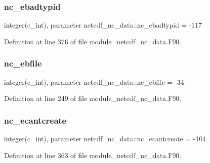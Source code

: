 \mbox{\label{namespacenetcdf__nc__data_aacaa397d41962ebba916f042f0f53759}} 
\subsubsection{\texorpdfstring{nc\+\_\+ebadtypid}{nc\_ebadtypid}}
{\footnotesize\ttfamily integer(c\+\_\+int), parameter netcdf\+\_\+nc\+\_\+data\+::nc\+\_\+ebadtypid = -\/117}



Definition at line 376 of file module\+\_\+netcdf\+\_\+nc\+\_\+data.\+F90.

\mbox{\label{namespacenetcdf__nc__data_a960115687ca85c5f961d7131ced33af5}} 
\subsubsection{\texorpdfstring{nc\+\_\+ebfile}{nc\_ebfile}}
{\footnotesize\ttfamily integer(c\+\_\+int), parameter netcdf\+\_\+nc\+\_\+data\+::nc\+\_\+ebfile = -\/34}



Definition at line 249 of file module\+\_\+netcdf\+\_\+nc\+\_\+data.\+F90.

\mbox{\label{namespacenetcdf__nc__data_a4b769146020153d93441a502218706e0}} 
\subsubsection{\texorpdfstring{nc\+\_\+ecantcreate}{nc\_ecantcreate}}
{\footnotesize\ttfamily integer(c\+\_\+int), parameter netcdf\+\_\+nc\+\_\+data\+::nc\+\_\+ecantcreate = -\/104}



Definition at line 363 of file module\+\_\+netcdf\+\_\+nc\+\_\+data.\+F90.

